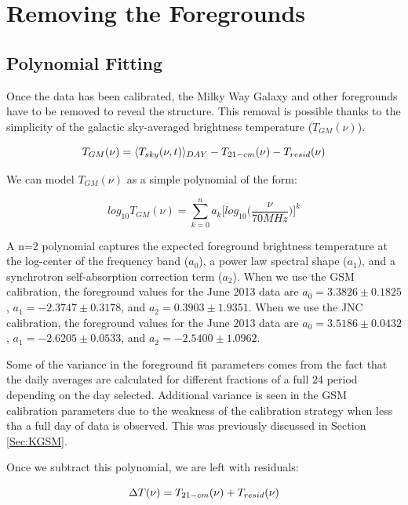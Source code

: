 \section{Removing the Foregrounds}\label{Sec:fore}


\subsection{Polynomial Fitting}

Once the data has been calibrated, the Milky Way Galaxy and other foregrounds have to be removed to reveal the \cm structure. This removal is possible thanks to the simplicity of the galactic sky-averaged brightness temperature ($T_{GM}(\nu)$). 

\begin{equation}
T_{GM}(\nu) = \langle T_{sky}(\nu,t) \rangle_{DAY} - T_{21-cm} (\nu) - T_{resid} (\nu)
\end{equation}

We can model $T_{GM} (\nu)$ as a simple polynomial of the form:

\begin{equation}
log_{10} T_{GM}(\nu) = \sum_{k=0}^n a_k \Big[ log_{10} \Big(\frac{\nu}{70 MHz}\Big) \Big]^k
\end{equation}

A n=2 polynomial captures the expected foreground brightness temperature at the log-center of the frequency band ($a_0$), a power law spectral shape ($a_1$), and a synchrotron self-absorption correction term ($a_2$). When we use the GSM calibration, the foreground values for the June 2013 data are $a_0 = 3.3826 \pm 0.1825$, $a_1 = -2.3747 \pm 0.3178$, and $a_2 = 0.3903 \pm 1.9351$. When we use the JNC calibration, the foreground values for the June 2013 data are $a_0 = 3.5186 \pm 0.0432$, $a_1 = -2.6205 \pm 0.0533$, and $a_2 = -2.5400 \pm 1.0962$. 

Some of the variance in the foreground fit parameters comes from the fact that the daily averages are calculated for different fractions of a full 24 period depending on the day selected. Additional variance is seen in the GSM calibration parameters due to the weakness of the calibration strategy when less tha a full day of data is observed. This was previously discussed in Section \ref{Sec:KGSM}.

Once we subtract this polynomial, we are left with residuals:

\begin{equation}
\Delta T (\nu) = T_{21-cm}(\nu)+T_{resid}(\nu)
\end{equation}

